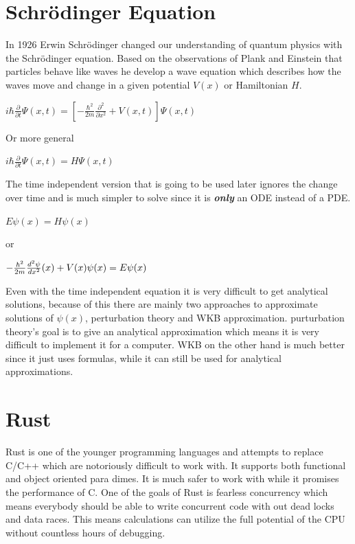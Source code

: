 \documentclass[11pt,DIV=10,final]{scrreprt} %
\begin{document}
\section{Schrödinger Equation}
In 1926 Erwin Schrödinger changed our understanding of quantum physics with the Schrödinger equation. Based on the observations of Plank and Einstein that particles
behave like waves he develop a wave equation which describes how the waves move and change in a given potential $V(x)$ or Hamiltonian $H$.
\begin{center}
\begin{math}
  i\hbar {\frac {\partial }{\partial t}}\Psi (x,t)=\left[-{\frac {\hbar ^{2}}{2m}}{\frac {\partial ^{2}}{\partial x^{2}}}+V(x,t)\right]\Psi (x,t)
\end{math}
\end{center}
Or more general
\begin{center}
\begin{math}
  i\hbar {\frac {\partial }{\partial t}}\Psi (x,t)=H \Psi(x,t)
\end{math}
\end{center}

The time independent version that is going to be used later ignores the change over time and is much simpler to solve since it is \emph{\textbf{only}} an ODE instead of a PDE.
\begin{center}
\begin{math}
  E \psi (x)=H \psi(x)
\end{math}
\end{center}
or
\begin{center}
\begin{math}
  -{\hbar^{2} \over 2m}  {d^{2} \psi \over dx^{2}} (x) + V(x) \psi(x) = E \psi(x)
\end{math}
\end{center}

Even with the time independent equation it is very difficult to get analytical solutions, because of this there are mainly two approaches to
approximate solutions of $\psi(x)$, perturbation theory and WKB approximation. purturbation theory's goal is to give an analytical approximation which means it
is very difficult to implement it for a computer. WKB on the other hand is much better since it just uses formulas, while it can still be used for analytical
approximations.

\section{Rust}
Rust is one of the younger programming languages and attempts to replace C/C++ which are notoriously difficult to work with. It supports both functional and object
oriented para dimes. It is much safer to work with while it promises the performance of C. One of the goals of Rust is fearless concurrency which means everybody should
be able to write concurrent code with out dead locks and data races. This means calculations can utilize the full potential of the CPU without countless hours of debugging.
\end{document}

